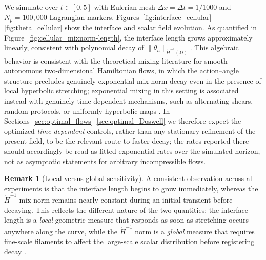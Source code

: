 \documentclass[12pt, reqno]{amsart}
\theoremstyle{plain}
\theoremstyle{definition}
\newtheorem{remark}[thm]{Remark}
\numberwithin{equation}{section}
\numberwithin{figure}{section}
\numberwithin{algorithm}{section}
\begin{document}
We simulate over $t\in[0,5]$ with Eulerian mesh $\Delta x=\Delta t=1/1000$ and $N_p=100{,}000$ Lagrangian markers. Figures~\ref{fig:interface_cellular}--\ref{fig:theta_cellular} show the interface and scalar field evolution. As quantified in Figure~\ref{fig:cellular_mixnorm-length}, the interface length grows approximately linearly, consistent with polynomial decay of $\|\theta_h\|_{\dot{H}^{-1}(\Omega)}$. This algebraic behavior is consistent with the theoretical mixing literature for smooth autonomous two-dimensional Hamiltonian flows, in which the action--angle structure precludes genuinely exponential mix-norm decay even in the presence of local hyperbolic stretching; exponential mixing in this setting is associated instead with genuinely time-dependent mechanisms, such as alternating shears, random protocols, or uniformly hyperbolic maps \cite{zelati2024mixing}. In Sections~\ref{sec:optimal_flows}--\ref{sec:optimal_Doswell} we therefore expect the optimized \emph{time-dependent} controls, rather than any stationary refinement of the present field, to be the relevant route to faster decay; the rates reported there should accordingly be read as fitted exponential rates over the simulated horizon, not as asymptotic statements for arbitrary incompressible flows.

\begin{remark}[Local versus global sensitivity]\label{rem:local_global}
A consistent observation across all experiments is that the interface length begins to grow immediately, whereas the $\dot{H}^{-1}$ mix-norm remains nearly constant during an initial transient before decaying. This reflects the different nature of the two quantities: the interface length is a \emph{local} geometric measure that responds as soon as stretching occurs anywhere along the curve, while the $\dot{H}^{-1}$ norm is a \emph{global} measure that requires fine-scale filaments to affect the large-scale scalar distribution before registering decay \cite{mathew2005multiscale, thiffeault2012using}.
\end{remark}
\end{document}
